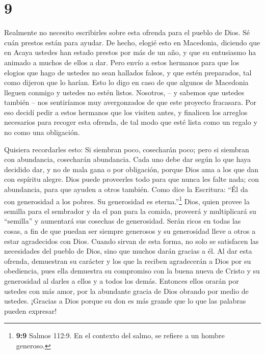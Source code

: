 \hypertarget{section-8}{%
\section{9}\label{section-8}}

 Realmente no necesito escribirles sobre esta ofrenda para
el pueblo de Dios.  Sé cuán prestos están para ayudar. De
hecho, elogié esto en Macedonia, diciendo que en Acaya ustedes han
estado prestos por más de un año, y que su entusiasmo ha animado a
muchos de ellos a dar.  Pero envío a estos hermanos para que
los elogios que hago de ustedes no sean hallados falsos, y que estén
preparados, tal como dijeron que lo harían.  Esto lo digo en
caso de que algunos de Macedonia lleguen conmigo y ustedes no estén
listos. Nosotros, -- y sabemos que ustedes también -- nos sentiríamos
muy avergonzados de que este proyecto fracasara.  Por eso
decidí pedir a estos hermanos que los visiten antes, y finalicen los
arreglos necesarios para recoger esta ofrenda, de tal modo que esté
lista como un regalo y no como una obligación.

 Quisiera recordarles esto: Si siembran poco, cosecharán
poco; pero si siembran con abundancia, cosecharán abundancia.
 Cada uno debe dar según lo que haya decidido dar, y no de
mala gana o por obligación, porque Dios ama a los que dan con espíritu
alegre.  Dios puede proveerles todo para que nunca les falte
nada; con abundancia, para que ayuden a otros también.  Como
dice la Escritura: ``Él da con generosidad a los pobres. Su generosidad
es eterna.''\footnote{\textbf{9:9} Salmos 112:9. En el contexto del
  salmo, se refiere a un hombre generoso.}  Dios, quien
provee la semilla para el sembrador y da el pan para la comida, proveerá
y multiplicará su ``semilla'' y aumentará sus cosechas de generosidad.
 Serán ricos en todas las cosas, a fin de que puedan ser
siempre generosos y su generosidad lleve a otros a estar agradecidos con
Dios.  Cuando sirvan de esta forma, no solo se satisfacen
las necesidades del pueblo de Dios, sino que muchos darán gracias a él.
 Al dar esta ofrenda, demuestran su carácter y los que la
reciben agradecerán a Dios por su obediencia, pues ella demuestra su
compromiso con la buena nueva de Cristo y su generosidad al darles a
ellos y a todos los demás.  Entonces ellos orarán por
ustedes con más amor, por la abundante gracia de Dios obrando por medio
de ustedes.  ¡Gracias a Dios porque su don es más grande
que lo que las palabras pueden expresar!

